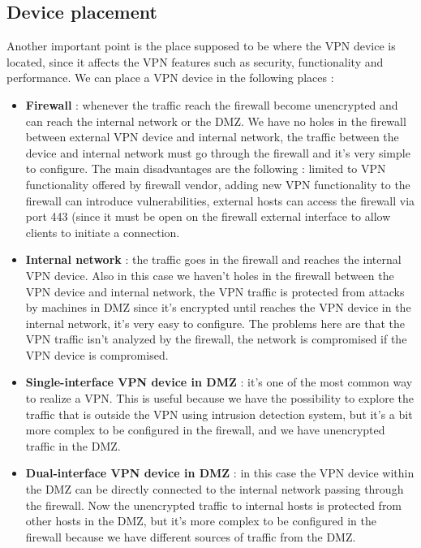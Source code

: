 \documentclass[11pt]{article}
\begin{document}
\subsection{Device placement}
Another important point is the place supposed to be where the VPN device is located, since it affects the VPN features such as security, functionality and performance. We can place a VPN device in the following places :
\begin{itemize}
\item \textbf{Firewall} : whenever the traffic reach the firewall become unencrypted and can reach the internal network or the DMZ. We have no holes in the firewall between external VPN device and internal network, the traffic between the device and internal network must go through the firewall and it's very simple to configure. The main disadvantages are the following : limited to VPN functionality offered by firewall vendor, adding new VPN functionality to the firewall can introduce vulnerabilities, external hosts can access the firewall via port 443 (since it must be open on the firewall external interface to allow clients to initiate a connection.
\item \textbf{Internal network} : the traffic goes in the firewall and reaches the internal VPN device. Also in this case we haven't holes in the firewall between the VPN device and internal network, the VPN traffic is protected from attacks by machines in DMZ since it's encrypted until reaches the VPN device in the internal network, it's very easy to configure. The problems here are that the VPN traffic isn't analyzed by the firewall, the network is compromised if the VPN device is compromised.
\item \textbf{Single-interface VPN device in DMZ} : it's one of the most common way to realize a VPN. This is useful because we have the possibility to explore the traffic that is outside the VPN using intrusion detection system, but it's a bit more complex to be configured in the firewall, and we have unencrypted traffic in the DMZ.
\item \textbf{Dual-interface VPN device in DMZ} : in this case the VPN device within the DMZ can be directly connected to the internal network passing through the firewall. Now the unencrypted traffic to internal hosts is protected from other hosts in the DMZ, but it's more complex to be configured in the firewall because we have different sources of traffic from the DMZ. 
\end{itemize} 
\end{document}
